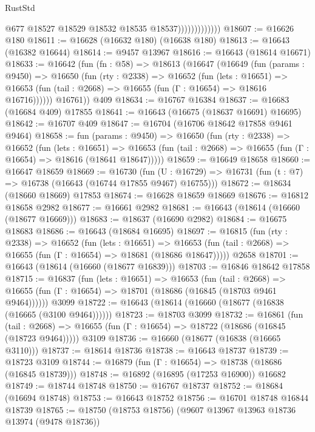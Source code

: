 \begin{lexlean}{RustStd}
\begin{coremodule}
                              @677
                              @18527
                              @18529
                              @18532
                              @18535
                              @18537)))))))))))))
@18607 := @16626 @180
@18611 := @16628 (@16632 @180) (@16638 @180)
@18613 := @16643 (@16382 @16644)
@18614 := @9457 @13967
@18616 := @16643 (@18614 @16671)
@18633 := @16642
    (fun (fn : @58) =>
    @18613
      (@16647
        (@16649
          (fun (params : @9450) =>
          @16650
            (fun (rty : @2338) =>
            @16652
              (fun (lets : @16651) =>
              @16653 (fun (tail : @2668) => @16655 (fun (Γ : @16654) => @18616 @16716))))))
        @16761))
    @409
@18634 := @16767 @16384
@18637 := @16683 (@16684 @409) @17855
@18641 := @16643 (@16675 (@18637 @16691) @16695)
@18642 := @16707 @409
@18647 := @16704 (@16706 @18642 @17858 @9461 @9464)
@18658 := fun (params : @9450) =>
  @16650
    (fun (rty : @2338) =>
    @16652
      (fun (lets : @16651) =>
      @16653 (fun (tail : @2668) => @16655 (fun (Γ : @16654) => @18616 (@18641 @18647)))))
@18659 := @16649 @18658
@18660 := @16647 @18659
@18669 := @16730
    (fun (U : @16729) => @16731 (fun (t : @7) => @16738 (@16643 (@16744 @17855 @9467) @16755)))
@18672 := @18634 (@18660 @18669) @17853
@18674 := @16628 @18659 @18669
@18676 := @16812 @18658 @2982
@18677 := @16661 @2982
@18681 := @16643 (@18614 (@16660 (@18677 @16669)))
@18683 := @18637 (@16690 @2982)
@18684 := @16675 @18683
@18686 := @16643 (@18684 @16695)
@18697 := @16815
    (fun (rty : @2338) =>
    @16652
      (fun (lets : @16651) =>
      @16653 (fun (tail : @2668) => @16655 (fun (Γ : @16654) => @18681 (@18686 @18647)))))
    @2658
@18701 := @16643 (@18614 (@16660 (@18677 @16839)))
@18703 := @16846 @18642 @17858
@18715 := @16837
    (fun (lets : @16651) =>
    @16653
      (fun (tail : @2668) =>
      @16655 (fun (Γ : @16654) => @18701 (@18686 (@16845 (@18703 @9461 @9464))))))
    @3099
@18722 := @16643 (@18614 (@16660 (@18677 (@16838 (@16665 (@3100 @9464))))))
@18723 := @18703 @3099
@18732 := @16861
    (fun (tail : @2668) => @16655 (fun (Γ : @16654) => @18722 (@18686 (@16845 (@18723 @9464)))))
    @3109
@18736 := @16660 (@18677 (@16838 (@16665 @3110)))
@18737 := @18614 @18736
@18738 := @16643 @18737
@18739 := @18723 @3109
@18744 := @16879 (fun (Γ : @16654) => @18738 (@18686 (@16845 @18739)))
@18748 := @16892 (@16895 (@17253 @16900)) @16682
@18749 := @18744 @18748
@18750 := @16767 @18737
@18752 := @18684 (@16694 @18748)
@18753 := @16643 @18752
@18756 := @16701 @18748 @16844 @18739
@18765 := @18750 (@18753 @18756) (@9607 @13967 @13963 @18736 @13974 (@9478 @18736))

\end{coremodule}
\end{lexlean}
